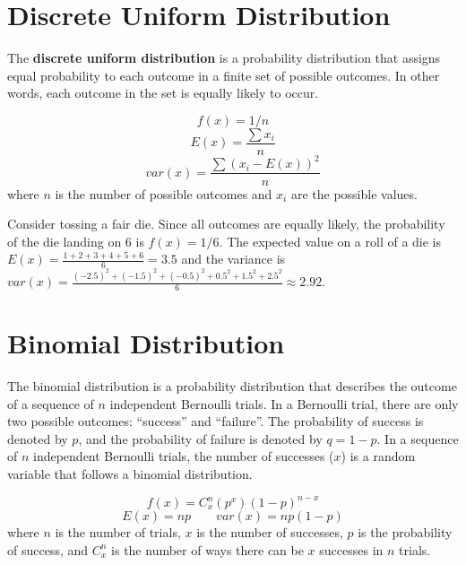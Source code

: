 \documentclass[
  11pt,
  letterpaper,
  DIV=11,
  numbers=noendperiod,
  oneside,
  open=any]{scrreprt}
\begin{document}
\section{Discrete Uniform
Distribution}\label{discrete-uniform-distribution}

The \textbf{discrete uniform distribution} is a probability distribution
that assigns equal probability to each outcome in a finite set of
possible outcomes. In other words, each outcome in the set is equally
likely to occur.

\begin{bsformula}

\[f(x)=1/n\] \[E(x)=\frac {\sum x_i}{n}\]
\[var(x)=\frac {\sum (x_i-E(x))^2}{n}\] where \(n\) is the number of
possible outcomes and \(x_i\) are the possible values.

\end{bsformula}

\begin{bsexample}[Example]

Consider tossing a fair die. Since all outcomes are equally likely, the
probability of the die landing on 6 is \(f(x)=1/6\). The expected value
on a roll of a die is \(E(x)=\frac {1+2+3+4+5+6}{6}=3.5\) and the
variance is
\(var(x)=\frac {(-2.5)^2+(-1.5)^2+(-0.5)^2+0.5^2+1.5^2+2.5^2}{6}\approx 2.92\).

\end{bsexample}

\section{Binomial Distribution}\label{binomial-distribution}

The binomial distribution is a probability distribution that describes
the outcome of a sequence of \(n\) independent Bernoulli trials. In a
Bernoulli trial, there are only two possible outcomes: ``success'' and
``failure''. The probability of success is denoted by \(p\), and the
probability of failure is denoted by \(q = 1 - p\). In a sequence of
\(n\) independent Bernoulli trials, the number of successes (\(x\)) is a
random variable that follows a binomial distribution.

\begin{bsformula}

\[f(x)=C_x^n (p^x)(1-p)^{n-x}\] \[E(x)=np \qquad var(x)=np(1-p)\] where
\(n\) is the number of trials, \(x\) is the number of successes, \(p\)
is the probability of success, and \(C_x^n\) is the number of ways there
can be \(x\) successes in \(n\) trials.

\end{bsformula}
\end{document}
